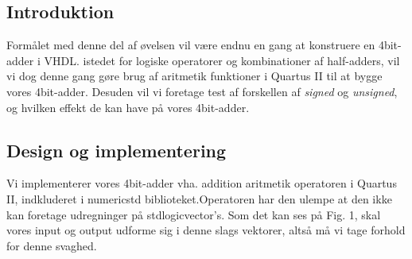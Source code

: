 \documentclass[../journal2.tex]{subfiles}
\begin{document}
\subsection{Introduktion}
Formålet med denne del af øvelsen vil være endnu en gang at konstruere en 4bit-adder i VHDL. istedet for logiske operatorer og kombinationer af half-adders, vil vi dog denne gang gøre brug af aritmetik funktioner i Quartus II til at bygge vores 4bit-adder. Desuden vil vi foretage test af forskellen af \textit{signed} og \textit{unsigned}, og hvilken effekt de kan have på vores 4bit-adder.

\subsection{Design og implementering}
Vi implementerer vores 4bit-adder vha. addition aritmetik operatoren i Quartus II, indkluderet i numeric\textunderscore std biblioteket.Operatoren har den ulempe at den ikke kan foretage udregninger på std\textunderscore logic\textunderscore vector's. Som det kan ses på Fig. 1, skal vores input og output udforme sig i denne slags vektorer, altså må vi tage forhold for denne svaghed.

\end{document}
